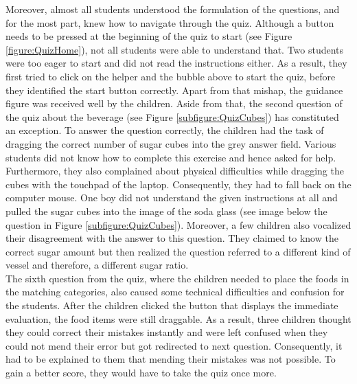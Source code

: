 Moreover, almost all students understood the formulation of the questions, and for the most part, knew how to navigate through the quiz.
Although a button needs to be pressed at the beginning of the quiz to start (see Figure \ref{figure:QuizHome}), not all students were able to understand that. Two students were too eager to start and did not read the instructions either. As a result, they first tried to click on the helper and the bubble above to start the quiz, before they identified the start button correctly. Apart from that mishap, the guidance figure was received well by the children.
Aside from that, the second question of the quiz about the beverage (see Figure \ref{subfigure:QuizCubes}) has constituted an exception. To answer the question correctly, the children had the task of dragging the correct number of sugar cubes into the grey answer field. Various students did not know how to complete this exercise and hence asked for help. Furthermore, they also complained about physical difficulties while dragging the cubes with the touchpad of the laptop. Consequently, they had to fall back on the computer mouse. One boy did not understand the given instructions at all and pulled the sugar cubes into the image of the soda glass (see image below the question in Figure \ref{subfigure:QuizCubes}). 
Moreover, a few children also vocalized their disagreement with the answer to this question. They claimed to know the correct sugar amount but then realized the question referred to a different kind of vessel and therefore, a different sugar ratio. \\
The sixth question from the quiz, where the children needed to place the foods in the matching categories, also caused some technical difficulties and confusion for the students. After the children clicked the button that displays the immediate evaluation, the food items were still draggable. As a result, three children thought they could correct their mistakes instantly and were left confused when they could not mend their error but got redirected to next question. Consequently, it had to be explained to them that mending their mistakes was not possible. To gain a better score, they would have to take the quiz once more.

